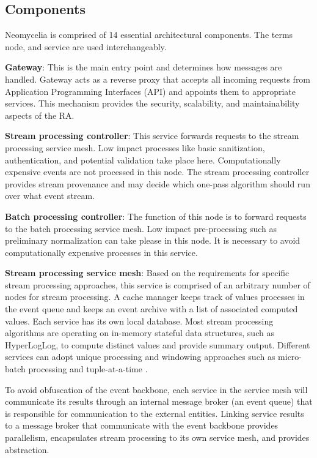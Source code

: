 \documentclass[runningheads]{llncs}
\begin{document}
\subsection{Components}

Neomycelia is comprised of 14 essential architectural components. The terms node, and service are used interchangeably.

\textbf{Gateway}: This is the main entry point and determines how messages are handled. Gateway acts as a reverse proxy that accepts all incoming requests from Application Programming Interfaces (API) and appoints them to appropriate services. This mechanism provides the security, scalability, and maintainability aspects of the RA.

\textbf{Stream processing controller}: This service forwards requests to the stream processing service mesh. Low impact processes like basic sanitization, authentication, and potential validation take place here. Computationally expensive events are not processed in this node. The stream processing controller provides stream provenance and may decide which one-pass algorithm should run over what event stream.

\textbf{Batch processing controller}: The function of this node is to forward requests to the batch processing service mesh. Low impact pre-processing such as preliminary normalization can take please in this node. It is necessary to avoid computationally expensive processes in this service.

\textbf{Stream processing service mesh}: Based on the requirements for specific stream processing approaches, this service is comprised of an arbitrary number of nodes for stream processing. A cache manager keeps track of values processes in the event queue and keeps an event archive with a list of associated computed values. Each service has its own local database. Most stream processing algorithms are operating on in-memory stateful data structures, such as HyperLogLog, to compute distinct values and provide summary output. Different services can adopt unique processing and windowing approaches such as micro-batch processing and tuple-at-a-time \cite{Sahal}.

To avoid obfuscation of the event backbone, each service in the service mesh will communicate its results through an internal message broker (an event queue) that is responsible for communication to the external entities. Linking service results to a message broker that communicate with the event backbone provides parallelism, encapsulates stream processing to its own service mesh, and provides abstraction.
\end{document}
